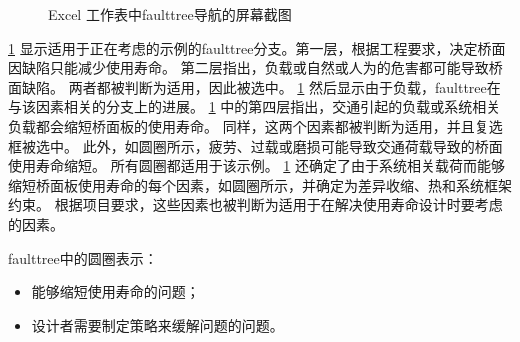 \begin{figure}
  \caption{Excel 工作表中\gls*{faulttree}导航的屏幕截图}\label{fig:screenshort}
\end{figure}

\cref{fig:screenshort} 显示适用于正在考虑的示例的\gls*{faulttree}分支。第一层，根据工程要求，决定桥面因缺陷只能减少{使用寿命}。 第二层指出，负载或自然或人为的危害都可能导致桥面缺陷。 两者都被判断为适用，因此被选中。 \cref{fig:screenshort} 然后显示由于负载，\gls*{faulttree}在与该因素相关的分支上的进展。 \cref{fig:screenshort} 中的第四层指出，交通引起的负载或系统相关负载都会缩短桥面板的{使用寿命}。 同样，这两个因素都被判断为适用，并且复选框被选中。 此外，如圆圈所示，疲劳、过载或磨损可能导致交通荷载导致的桥面{使用寿命}缩短。 所有圆圈都适用于该示例。 \cref{fig:screenshort} 还确定了由于系统相关载荷而能够缩短桥面板{使用寿命}的每个因素，如圆圈所示，并确定为差异收缩、热和系统框架约束。 根据项目要求，这些因素也被判断为适用于在解决{使用寿命}设计时要考虑的因素。

\gls*{faulttree}中的圆圈表示：

\begin{itemize}
  \item 能够缩短使用寿命的问题；
  \item 设计者需要制定策略来缓解问题的问题。
\end{itemize}

